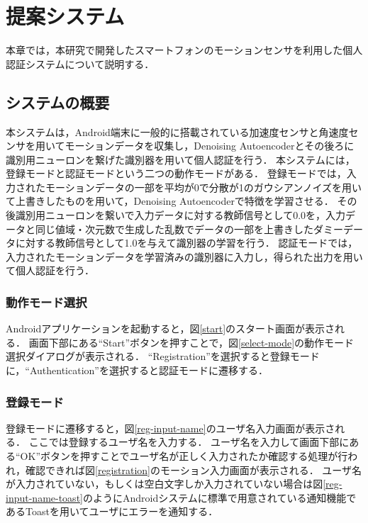 \chapter{提案システム}
本章では，本研究で開発したスマートフォンのモーションセンサを利用した個人認証システムについて説明する．

\section{システムの概要}
本システムは，Android端末に一般的に搭載されている加速度センサと角速度センサを用いてモーションデータを収集し，Denoising Autoencoderとその後ろに識別用ニューロンを繋げた識別器を用いて個人認証を行う．
本システムには，登録モードと認証モードという二つの動作モードがある．
登録モードでは，入力されたモーションデータの一部を平均が0で分散が1のガウシアンノイズを用いて上書きしたものを用いて，Denoising Autoencoderで特徴を学習させる．
その後識別用ニューロンを繋いで入力データに対する教師信号として0.0を，入力データと同じ値域・次元数で生成した乱数でデータの一部を上書きしたダミーデータに対する教師信号として1.0を与えて識別器の学習を行う．
認証モードでは，入力されたモーションデータを学習済みの識別器に入力し，得られた出力を用いて個人認証を行う．

\subsection{動作モード選択}
Androidアプリケーションを起動すると，図\ref{start}のスタート画面が表示される．
画面下部にある``Start''ボタンを押すことで，図\ref{select-mode}の動作モード選択ダイアログが表示される．
``Registration''を選択すると登録モードに，``Authentication''を選択すると認証モードに遷移する．

\subsection{登録モード}
登録モードに遷移すると，図\ref{reg-input-name}のユーザ名入力画面が表示される．
ここでは登録するユーザ名を入力する．
ユーザ名を入力して画面下部にある``OK''ボタンを押すことでユーザ名が正しく入力されたか確認する処理が行われ，確認できれば図\ref{registration}のモーション入力画面が表示される．
ユーザ名が入力されていない，もしくは空白文字しか入力されていない場合は図\ref{reg-input-name-toast}のようにAndroidシステムに標準で用意されている通知機能であるToastを用いてユーザにエラーを通知する．

